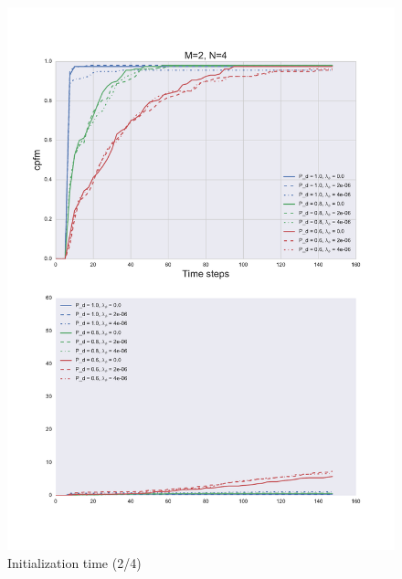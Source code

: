\begin{figure}
\centering
\includegraphics[height = .9\textheight]{Figures/plots/Scenario1_Init-Time(2-4).pdf}
\caption{Initialization time (2/4)}\label{fig:init_time_2-4}
\end{figure}

